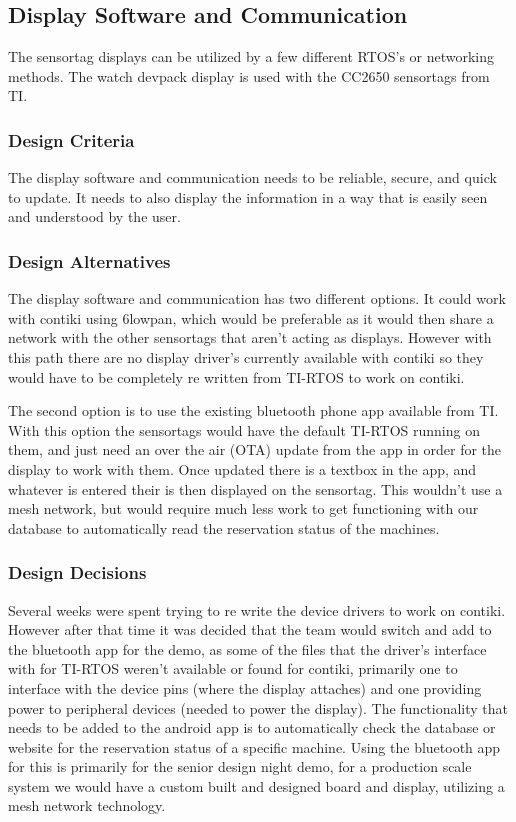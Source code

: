 \documentclass[PPFS.tex]{template/subfiles}
\begin{document}
\subsection{Display Software and Communication}
The sensortag displays can be utilized by a few different RTOS's or networking methods. The watch devpack display is used with the CC2650 sensortags from TI. 

\subsubsection{Design Criteria}
The display software and communication needs to be reliable, secure, and quick to update. It needs to also display the information in a way that is easily seen and understood by the user. 

\subsubsection{Design Alternatives}
The display software and communication has two different options. It could work with contiki using 6lowpan, which would be preferable as it would then share a network with the other sensortags that aren't acting as displays. However with this path there are no display driver's currently available with contiki so they would have to be completely re written from TI-RTOS to work on contiki. 

The second option is to use the existing bluetooth phone app available from TI. With this option the sensortags would have the default TI-RTOS running on them, and just need an over the air (OTA) update from the app in order for the display to work with them. Once updated there is a textbox in the app, and whatever is entered their is then displayed on the sensortag. This wouldn't use a mesh network, but would require much less work to get functioning with our database to automatically read the reservation status of the machines. 

\subsubsection{Design Decisions}
Several weeks were spent trying to re write the device drivers to work on contiki. However after that time it was decided that the team would switch and add to the bluetooth app for the demo, as some of the files that the driver's interface with for TI-RTOS weren't available or found for contiki, primarily one to interface with the device pins (where the display attaches) and one providing power to peripheral devices (needed to power the display). The functionality that needs to be added to the android app is to automatically check the database or website for the reservation status of a specific machine. Using the bluetooth app for this is primarily for the senior design night demo, for a production scale system we would have a custom built and designed board and display, utilizing a mesh network technology. 
\end{document}
